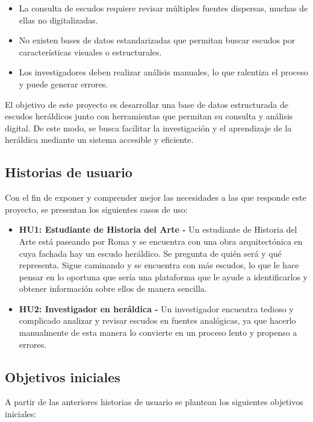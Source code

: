 \begin{itemize}
    \item La consulta de escudos requiere revisar múltiples fuentes dispersas, 
    muchas de ellas no digitalizadas.
    \item No existen bases de datos estandarizadas que permitan buscar escudos por
    características visuales o estructurales.
    \item Los investigadores deben realizar análisis manuales, lo que ralentiza el
    proceso y puede generar errores.
\end{itemize}

El objetivo de este proyecto es desarrollar una base de datos estructurada de escudos
heráldicos junto con herramientas que permitan su consulta y análisis digital. De este
modo, se busca facilitar la investigación y el aprendizaje de la heráldica mediante un
sistema accesible y eficiente.

\subsection{Historias de usuario}
Con el fin de exponer y comprender mejor las necesidades a las que responde este
proyecto, se presentan los siguientes casos de uso:

\begin{itemize}
    \item \textbf{HU1: Estudiante de Historia del Arte - } Un estudiante de Historia del 
    Arte está paseando por Roma y se encuentra con una obra arquitectónica en cuya fachada
    hay un escudo heráldico. Se pregunta de quién será y qué representa. Sigue caminando 
    y se encuentra con más escudos, lo que le hace pensar en lo oportuna que sería una 
    plataforma que le ayude a identificarlos y obtener información sobre ellos de manera 
    sencilla.
    \item \textbf{HU2: Investigador en heráldica - } Un investigador encuentra tedioso y
    complicado analizar y revisar escudos en fuentes analógicas, ya que hacerlo manualmente
    de esta manera lo convierte en un proceso lento y propenso a errores.
\end{itemize}

\subsection{Objetivos iniciales}
A partir de las anteriores historias de usuario se plantean los siguientes objetivos
iniciales:


